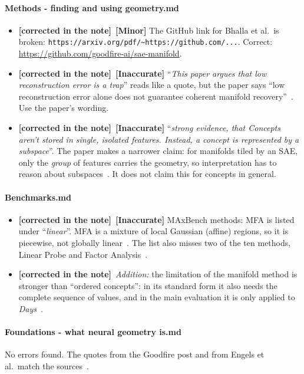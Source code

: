 \documentclass[11pt,a4paper]{article}
\newcommand{\note}[1]{\textsf{#1}}                 %
\newcommand{\sev}[1]{\textbf{[#1]}}                 %
\newcommand{\claim}[1]{\enquote{\textit{#1}}}       %
\newcommand{\fixed}{\textbf{\textcolor{green!50!black}{[corrected in the note]}}} %
\begin{document}
\paragraph{\note{Methods - finding and using geometry.md}}
\begin{itemize}
  \item \fixed\ \sev{Minor} The GitHub link for Bhalla et al.\ is broken:
    \nolinkurl{https://arxiv.org/pdf/~https://github.com/...}.
    Correct: \url{https://github.com/goodfire-ai/sae-manifold}.
  \item \fixed\ \sev{Inaccurate} \claim{This paper argues that low reconstruction
    error is a trap} reads like a quote, but the paper says \enquote{low
    reconstruction error alone does not guarantee coherent manifold
    recovery}~\cite{bhalla2026saemanifolds}. Use the paper's wording.
  \item \fixed\ \sev{Inaccurate} \claim{strong evidence, that Concepts aren't stored
    in single, isolated features. Instead, a concept is represented by a
    subspace}. The paper makes a narrower claim: for manifolds tiled by an
    SAE, only the \emph{group} of features carries the geometry, so
    interpretation has to reason about subspaces~\cite{bhalla2026saemanifolds}.
    It does not claim this for concepts in general.
\end{itemize}

\paragraph{\note{Benchmarks.md}}
\begin{itemize}
  \item \fixed\ \sev{Inaccurate} MAxBench methods: MFA is listed under
    \claim{linear}. MFA is a mixture of local Gaussian (affine) regions, so
    it is piecewise, not globally linear~\cite{shafran2026regions}. The list
    also misses two of the ten methods, Linear Probe and Factor
    Analysis~\cite{appapogu2026maxbench}.
  \item \fixed\ \textit{Addition:} the limitation of the manifold method is
    stronger than \enquote{ordered concepts}: in its standard form it also
    needs the complete sequence of values, and in the main evaluation it
    is only applied to \emph{Days}~\cite{appapogu2026maxbench}.
\end{itemize}

\paragraph{\note{Foundations - what neural geometry is.md}}
No errors found. The quotes from the Goodfire post and from Engels et al.\
match the sources~\cite{goodfire2026world,engels2025notall}.
\end{document}
